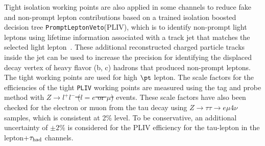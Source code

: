 \documentclass[PAPER, coverpage, atlasdraft=true, texlive=2016, UKenglish]{\ATLASLATEXPATH atlasdoc}
\providecommand{\DIFadd}[1]{{\protect\color{blue}\uwave{#1}}} %
\providecommand{\DIFdel}[1]{{\protect\color{red}\sout{#1}}}                      %
\providecommand{\DIFaddbegin}{} %
\providecommand{\DIFaddend}{} %
\providecommand{\DIFdelbegin}{} %
\providecommand{\DIFdelend}{} %
\begin{document}
Tight isolation working points are also applied in some channels to reduce fake and non-prompt lepton contributions based on a trained isolation boosted decision tree \texttt{PromptLeptonVeto}(PLIV), which is to identify non-prompt light leptons using lifetime information associated with a track jet that matches the selected light lepton~\cite{ATLAS-CONF-2019-045}. These additional reconstructed charged particle tracks inside the jet can be
used to increase the precision for identifying the displaced decay vertex of heavy flavor (b, c) hadrons that produced non-prompt leptons.
The tight working points are used for high $\pt$ lepton.
The scale factors for the efficiencies of the tight \texttt{PLIV} working points are measured using the tag and probe method
with \DIFdelbegin \DIFdel{$Z\rightarrow l^+l^-$ ($l=e$ or $\mu$) }\DIFdelend \DIFaddbegin \DIFadd{$Z\rightarrow \ell^+\ell^-$ }\DIFaddend events. These scale factors have also been checked for the electron or muon from the tau decay
using $Z\rightarrow\tau\tau\rightarrow e\mu4\nu$ samples, which is consistent at 2\% level. To be conservative, an
additional uncertainty of $\pm 2\%$ is considered for the PLIV efficiency for the tau-lepton in the lepton+$\tau_\text{had}$ channels.
\end{document}
